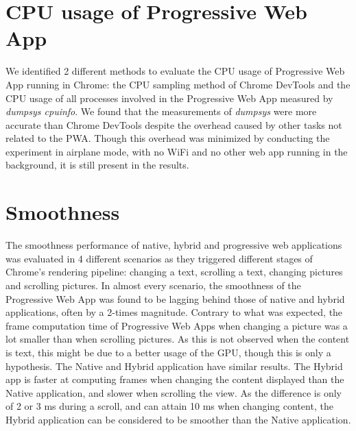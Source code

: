 \documentclass{kththesis}
\begin{document}
\section{CPU usage of Progressive Web App}
We identified 2 different methods to evaluate the CPU usage of Progressive Web App running in Chrome: the CPU sampling method of Chrome DevTools and the CPU usage of all processes involved in the Progressive Web App measured by \textit{dumpsys cpuinfo}. We found that the measurements of \textit{dumpsys} were more accurate than Chrome DevTools despite the overhead caused by other tasks not related to the PWA. Though this overhead was minimized by conducting the experiment in airplane mode, with no WiFi and no other web app running in the background, it is still present in the results. 

\section{Smoothness}
The smoothness performance of native, hybrid and progressive web applications was evaluated in 4 different scenarios as they triggered different stages of Chrome's rendering pipeline: changing a text, scrolling a text, changing pictures and scrolling pictures. In almost every scenario, the smoothness of the Progressive Web App was found to be lagging behind those of native and hybrid applications, often by a 2-times magnitude.\newline
Contrary to what was expected, the frame computation time of Progressive Web Apps when changing a picture was a lot smaller than when scrolling pictures. As this is not observed when the content is text, this might be due to a better usage of the GPU, though this is only a hypothesis. \newline
The Native and Hybrid application have similar results. The Hybrid app is faster at computing frames when changing the content displayed than the Native application, and slower when scrolling the view. As the difference is only of 2 or 3 ms during a scroll, and can attain 10 ms when changing content, the Hybrid application can be considered to be smoother than the Native application.
\end{document}
